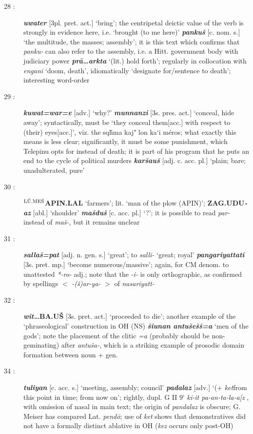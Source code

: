 \documentclass[10pt]{article}
\newcommand{\supersc}[1]{$^{\textrm{\scriptsize{#1}}}$}  	%
\newcommand{\bit}[1]{\textbf{\textit{#1}}}				%
\newcommand{\p}[1]{{\tiny[{#1}]}}					%
\newcommand{\pr}{\'{ }}									%
\newcommand{\hith}{\textsubwedge{h}}
\newcommand{\men}{\supersc{L\'U.ME\v{S}}}
\renewcommand{\.}[1]{\textsubdot{#1}}
\begin{document}
\begin{description}
\item[28 :] \bit{uwater} \p{3pl. pret. act.} `bring'; the centripetal deictic value of the verb is strongly in evidence here, i.e. `brought (to me here)' \bit{panku\v{s}} \p{c. nom. s.} `the multitude, the masses; assembly'; it is this text which confirms that \textit{panku-} can also refer to the assembly, i.e. a Hitt. government body with judiciary power \bit{pr\=a{\ldots}{\hith}arkta} `(lit.) hold forth'; regularly in collocation with \textit{{\hith}engani} `doom, death', idiomatically `designate for/sentence to death'; interesting word-order

\item[29 :] \bit{kuwat=war=e} \p{adv.} `why?' \bit{munnanzi} \p{3s. pres. act.} `conceal, hide away'; syntactically, must be `they conceal them\p{acc.} with respect to (their) eyes\p{acc.}', viz. the {\greektext sq\~hma kaj" lon ka`i m\'eros}; what exactly this means is less clear; significantly, it must be some punishment, which Telepinu opts for instead of death; it is part of his program that he puts an end to the cycle of political murders \bit{kar\v{s}au\v{s}} \p{adj. c. acc. pl.} `plain; bare; unadulterated, pure'

\item[30 :] \textbf{{\men}APIN.LAL} `farmers'; lit. `man of the plow (APIN)'; \textbf{ZAG.UDU}\bit{-az} \p{abl.} `shoulder' \bit{ma\v{s}du\v{s}} \p{c. acc. pl.} `?'; it is possible to read \textit{par-} instead of \textit{ma\v{s}-}, but it remains unclear

\item[31 :] \bit{salla\v{s}=pat} \p{adj. n. gen. s.} `great'; to \textit{salli-} `great; royal' \bit{pangariyattati} \p{3s. pret. mp.} `become numerous/massive'; again, for CM denom. to unattested \textit{*-ro-} adj.; note that the \textit{-i-} is only orthographic, as confirmed by spellings $<$ \textit{-(\v{s})ar-ya-} $>$ of \textit{na{\hith}sariyatt-}

\item[32 :] \bit{wit{\ldots}}\textbf{BA.U\v{S}} \p{3s. pret. act.} `proceeded to die'; another example of the `phraseological' construction  in OH (NS) \bit{\v{s}iunan antu{\hith}\v{s}e\v{s}\v{s}=a} `men of the gods'; note the placement of the clitic \textit{=a} (probably should be non-geminating) after \textit{antu{\hith}\v{s}a-}, which is a striking example of prosodic domain formation between noun + gen. 

\item[34 :] \bit{tuliyan} \p{c. acc. s.} `meeting, assembly; council' \bit{padalaz} \p{adv.} `(+ \textit{ket}from this point in time; from now on'; rightly, dupl. G II 9{\pr} \textit{ki-it pa-an-ta-la-a[z }, with omission of nasal in main text; the origin of \textit{pandalaz} is obscure; G. Meiser has compared Lat. \textit{pend\=o}; use of \textit{ket} shows that demonstratives did not have a formally distinct ablative in OH (\textit{kez} occurs only post-OH)


\end{description}
\end{document}
